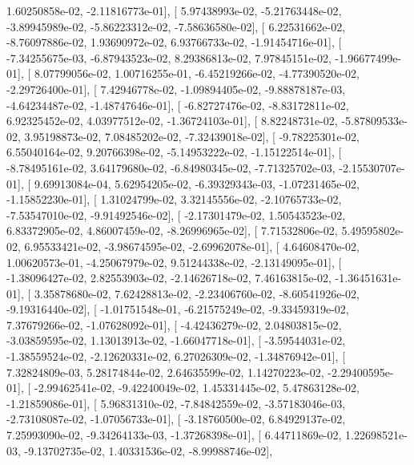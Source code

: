 \documentclass{article}
\begin{document}
          1.60250858e-02,  -2.11816773e-01],
       [  5.97438993e-02,  -5.21763448e-02,  -3.89945989e-02,
         -5.86223312e-02,  -7.58636580e-02],
       [  6.22531662e-02,  -8.76097886e-02,   1.93690972e-02,
          6.93766733e-02,  -1.91454716e-01],
       [ -7.34255675e-03,  -6.87943523e-02,   8.29386813e-02,
          7.97845151e-02,  -1.96677499e-01],
       [  8.07799056e-02,   1.00716255e-01,  -6.45219266e-02,
         -4.77390520e-02,  -2.29726400e-01],
       [  7.42946778e-02,  -1.09894405e-02,  -9.88878187e-03,
         -4.64234487e-02,  -1.48747646e-01],
       [ -6.82727476e-02,  -8.83172811e-02,   6.92325452e-02,
          4.03977512e-02,  -1.36724103e-01],
       [  8.82248731e-02,  -5.87809533e-02,   3.95198873e-02,
          7.08485202e-02,  -7.32439018e-02],
       [ -9.78225301e-02,   6.55040164e-02,   9.20766398e-02,
         -5.14953222e-02,  -1.15122514e-01],
       [ -8.78495161e-02,   3.64179680e-02,  -6.84980345e-02,
         -7.71325702e-03,  -2.15530707e-01],
       [  9.69913084e-04,   5.62954205e-02,  -6.39329343e-03,
         -1.07231465e-02,  -1.15852230e-01],
       [  1.31024799e-02,   3.32145556e-02,  -2.10765733e-02,
         -7.53547010e-02,  -9.91492546e-02],
       [ -2.17301479e-02,   1.50543523e-02,   6.83372905e-02,
          4.86007459e-02,  -8.26996965e-02],
       [  7.71532806e-02,   5.49595802e-02,   6.95533421e-02,
         -3.98674595e-02,  -2.69962078e-01],
       [  4.64608470e-02,   1.00620573e-01,  -4.25067979e-02,
          9.51244338e-02,  -2.13149095e-01],
       [ -1.38096427e-02,   2.82553903e-02,  -2.14626718e-02,
          7.46163815e-02,  -1.36451631e-01],
       [  3.35878680e-02,   7.62428813e-02,  -2.23406760e-02,
         -8.60541926e-02,  -9.19316440e-02],
       [ -1.01751548e-01,  -6.21575249e-02,  -9.33459319e-02,
          7.37679266e-02,  -1.07628092e-01],
       [ -4.42436279e-02,   2.04803815e-02,  -3.03859595e-02,
          1.13013913e-02,  -1.66047718e-01],
       [ -3.59544031e-02,  -1.38559524e-02,  -2.12620331e-02,
          6.27026309e-02,  -1.34876942e-01],
       [  7.32824809e-03,   5.28174844e-02,   2.64635599e-02,
          1.14270223e-02,  -2.29400595e-01],
       [ -2.99462541e-02,  -9.42240049e-02,   1.45331445e-02,
          5.47863128e-02,  -1.21859086e-01],
       [  5.96831310e-02,  -7.84842559e-02,  -3.57183046e-03,
         -2.73108087e-02,  -1.07056733e-01],
       [ -3.18760500e-02,   6.84929137e-02,   7.25993090e-02,
         -9.34264133e-03,  -1.37268398e-01],
       [  6.44711869e-02,   1.22698521e-03,  -9.13702735e-02,
          1.40331536e-02,  -8.99988746e-02],
\end{document}
